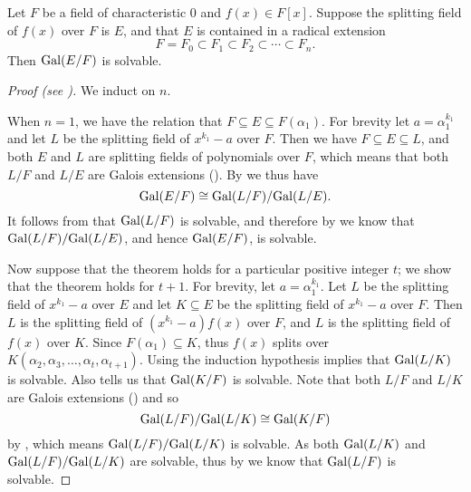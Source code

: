 \begin{theorem}[Galois]\label{thrm-solvable-by-radicals-implies-solvable-group}
    Let $F$ be a field of characteristic 0 and $f(x) \in F[x]$. Suppose the splitting field of $f(x)$ over $F$ is $E$, and that $E$ is contained in a radical extension
    \[
        F = F_0 \subset F_1 \subset F_2 \subset \cdots \subset F_n.
    \]
    Then $\mathrm{Gal}(E/F)$ is solvable.
\end{theorem}
\begin{proof}[Proof (see {\cite[Theorem 32.5]{gallian_2016}})]
    We induct on $n$.

    When $n = 1$, we have the relation that $F \subseteq E \subseteq F(\alpha_1)$. For brevity let $a = \alpha_1^{k_1}$ and let $L$ be the splitting field of $x^{k_1} - a$ over $F$. Then we have $F \subseteq E \subseteq L$, and both $E$ and $L$ are splitting fields of polynomials over $F$, which means that both $L/F$ and $L/E$ are Galois extensions (). By  we thus have
    \[
        \mathrm{Gal}(E/F) \cong \mathrm{Gal}(L/F)/\mathrm{Gal}(L/E).
    \]
    It follows from  that $\mathrm{Gal}(L/F)$ is solvable, and therefore by  we know that $\mathrm{Gal}(L/F)/\mathrm{Gal}(L/E)$, and hence $\mathrm{Gal}(E/F)$, is solvable.

    Now suppose that the theorem holds for a particular positive integer $t$; we show that the theorem holds for $t + 1$. For brevity, let $a = \alpha_1^{k_1}$. Let $L$ be the splitting field of $x^{k_1} - a$ over $E$ and let $K \subseteq E$ be the splitting field of $x^{k_1} - a$ over $F$. Then $L$ is the splitting field of $(x^{k_1}-a)f(x)$ over $F$, and $L$ is the splitting field of $f(x)$ over $K$. Since $F(\alpha_1) \subseteq K$, thus $f(x)$ splits over $K(\alpha_2, \alpha_3, \dots, \alpha_t, \alpha_{t+1})$. Using the induction hypothesis implies that $\mathrm{Gal}(L/K)$ is solvable. Also  tells us that $\mathrm{Gal}(K/F)$ is solvable. Note that both $L/F$ and $L/K$ are Galois extensions () and so
    \[
        \mathrm{Gal}(L/F)/\mathrm{Gal}(L/K) \cong \mathrm{Gal}(K/F)
    \]
    by , which means $\mathrm{Gal}(L/F)/\mathrm{Gal}(L/K)$ is solvable. As both $\mathrm{Gal}(L/K)$ and $\mathrm{Gal}(L/F)/\mathrm{Gal}(L/K)$ are solvable, thus by  we know that $\mathrm{Gal}(L/F)$ is solvable.


\end{proof}

